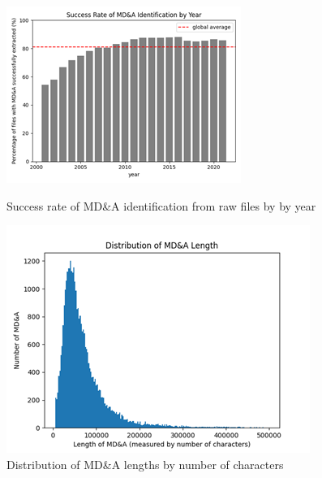 \begin{figure}[!tbp]
  \centering
  \begin{minipage}[b]{0.45\textwidth}
    \includegraphics[width=\textwidth]{figures/MDAidentified.png}
    \caption{Success rate of MD\&A identification from raw files by by year}
    \label{fig:MDAidentified}

  \end{minipage}
  \hfill
  \begin{minipage}[b]{0.45\textwidth}
    \includegraphics[width=\textwidth]{figures/MDAlen.png}
    \caption{Distribution of MD\&A lengths by number of characters}
    \label{fig:MDAlen}

  \end{minipage}
\end{figure}



